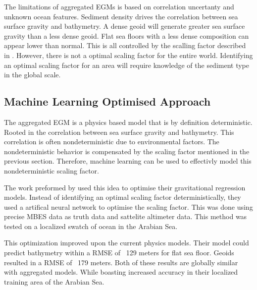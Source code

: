 \par
The limitations of aggregated \ac{EGM}s is based on correlation uncertanty and unknown ocean features.
Sediment density drives the correlation between sea surface gravity and bathymetry.
A dense geoid will generate greater sea surface gravity than a less dense geoid.
Flat sea floors with a less dense composition can appear lower than normal.
This is all controlled by the scalling factor described in \cite{smith1994bathymetric}. 
However, there is not a optimal scaling factor for the entire world.
Identifying an optimal scaling factor for an area will require knowledge of the sediment type in the global scale.




\subsection{Machine Learning Optimised Approach}
The aggregated \ac{EGM} is a physics based model that is by definition deterministic.
Rooted in the correlation between sea surface gravity and bathymetry.
This correlation is often nondeterministic due to environmental factors.
The nondeterministic behavior is compensated by the scaling factor mentioned in the previous section.
Therefore, machine learning can be used to effectivly model this nondeterministic scaling factor.

\par
The work preformed by \cite{jena2012prediction} used this idea to optimise their gravitational regression models.
Instead of identifying an optimal scaling factor deterministically, they used a artifical neural network to optimise the scaling factor.
This was done using precise \ac{MBES} data as truth data and sattelite altimeter data.
This method was tested on a localized swatch of ocean in the Arabian Sea.

\par
This optimization improved upon the current physics models.
Their model could predict bathymetry within a \ac{RMSE} of ~129 meters for flat sea floor.
Geoids resulted in a \ac{RMSE} of ~179 meters.
Both of these results are globally similar with aggregated models.
While boasting increased accuracy in their localized training area of the Arabian Sea.

